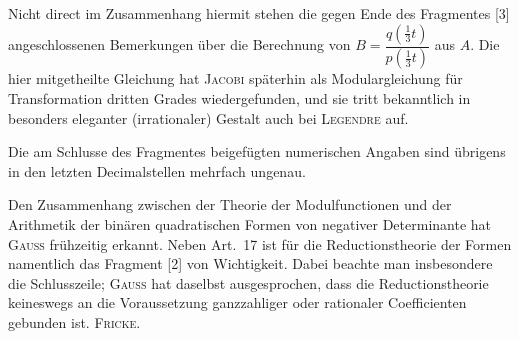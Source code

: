 Nicht direct im Zusammenhang hiermit stehen die gegen Ende des Fragmentes [3] angeschlossenen Bemerkungen über die Berechnung von $B = \dfrac{q(\frac13 t)}{p(\frac13 t)}$ aus $A$. Die hier mitgetheilte Gleichung hat \textsc{Jacobi} späterhin als Modulargleichung für Transformation dritten Grades wiedergefunden, und sie tritt bekanntlich in besonders eleganter (irrationaler) Gestalt auch bei \textsc{Legendre} auf.

Die am Schlusse des Fragmentes beigefügten numerischen Angaben sind übrigens in den letzten Decimalstellen mehrfach ungenau.

Den Zusammenhang zwischen der Theorie der Modulfunctionen und der Arithmetik der binären quadratischen Formen von negativer Determinante hat \textsc{Gauss} frühzeitig erkannt. Neben Art.~17 ist für die Reductionstheorie der Formen namentlich das Fragment [2] von Wichtigkeit. Dabei beachte man insbesondere die Schlusszeile; \textsc{Gauss} hat daselbst ausgesprochen, dass die Reductionstheorie keineswegs an die Voraussetzung ganzzahliger oder rationaler Coefficienten gebunden ist. \hfill \textsc{Fricke}.

